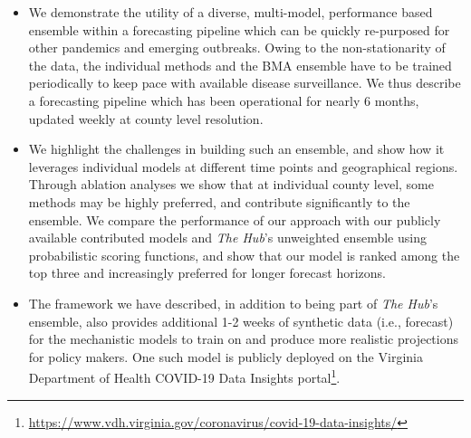 \documentclass[sigconf]{acmart}
\newcommand{\hub}{\emph{The Hub}}
\begin{document}
\begin{itemize}
\item We demonstrate the utility of a diverse, multi-model, performance based ensemble within a forecasting pipeline which can be quickly re-purposed for other pandemics and emerging outbreaks. Owing to the non-stationarity of the data, the individual methods and the BMA ensemble have to be trained periodically to keep pace with available disease surveillance. We thus describe a forecasting pipeline which has been operational for nearly 6 months, updated weekly at county level resolution.
    
\item We highlight the challenges in building such an ensemble, and show how it leverages individual models at different time points and geographical regions. Through ablation analyses we show that at individual county level, some methods may be highly preferred, and contribute significantly to the ensemble. We compare the performance of our approach with our publicly available contributed models and \hub{}'s unweighted ensemble using probabilistic scoring functions, and show that our model is ranked among the top three and increasingly preferred for longer forecast horizons. 
    
\item The framework we have described, in addition to being part of \hub{}'s ensemble, also provides additional 1-2 weeks of synthetic data (i.e., forecast) for the mechanistic models to train on and produce more realistic projections  for policy makers. One such model is publicly deployed on the Virginia Department of Health COVID-19 Data Insights portal\footnote{\url{https://www.vdh.virginia.gov/coronavirus/covid-19-data-insights/}}. 
\end{itemize}
\end{document}

